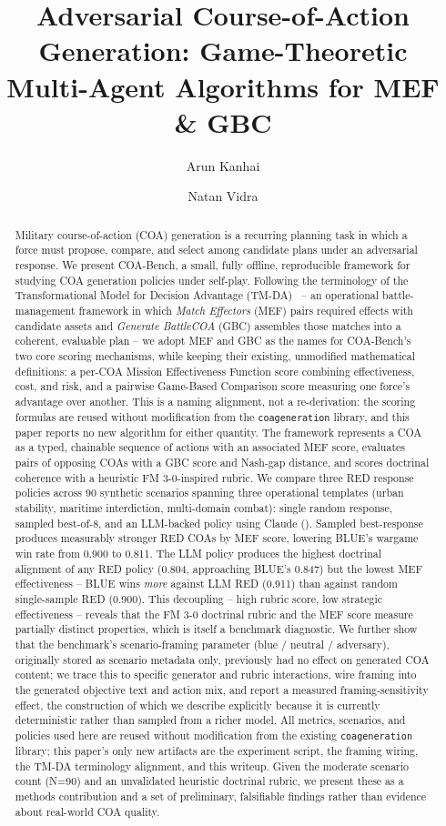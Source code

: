 \documentclass[sigconf]{acmart}
\title{Adversarial Course-of-Action Generation: Game-Theoretic Multi-Agent Algorithms for MEF \& GBC}
\author{Arun Kanhai}
\affiliation{%
  \institution{Anote AI, CUNY}
  \city{New York}
  \country{United States}}
\author{Natan Vidra}
\affiliation{%
  \institution{Anote AI}
  \city{New York}
  \country{United States}}
\begin{document}
\begin{abstract}
Military course-of-action (COA) generation is a recurring planning task in which a force must propose, compare, and select among candidate plans under an adversarial response. We present COA-Bench, a small, fully offline, reproducible framework for studying COA generation policies under self-play. Following the terminology of the Transformational Model for Decision Advantage (TM-DA)~\cite{tmda2025bootcamp} -- an operational battle-management framework in which \emph{Match Effectors} (MEF) pairs required effects with candidate assets and \emph{Generate BattleCOA} (GBC) assembles those matches into a coherent, evaluable plan -- we adopt MEF and GBC as the names for COA-Bench's two core scoring mechanisms, while keeping their existing, unmodified mathematical definitions: a per-COA Mission Effectiveness Function score combining effectiveness, cost, and risk, and a pairwise Game-Based Comparison score measuring one force's advantage over another. This is a naming alignment, not a re-derivation: the scoring formulas are reused without modification from the \texttt{coageneration} library, and this paper reports no new algorithm for either quantity. The framework represents a COA as a typed, chainable sequence of actions with an associated MEF score, evaluates pairs of opposing COAs with a GBC score and Nash-gap distance, and scores doctrinal coherence with a heuristic FM 3-0-inspired rubric. We compare three RED response policies across 90 synthetic scenarios spanning three operational templates (urban stability, maritime interdiction, multi-domain combat): single random response, sampled best-of-8, and an LLM-backed policy using Claude (). Sampled best-response produces measurably stronger RED COAs by MEF score, lowering BLUE's wargame win rate from 0.900 to 0.811. The LLM policy produces the highest doctrinal alignment of any RED policy (0.804, approaching BLUE's 0.847) but the lowest MEF effectiveness -- BLUE wins \emph{more} against LLM RED (0.911) than against random single-sample RED (0.900). This decoupling -- high rubric score, low strategic effectiveness -- reveals that the FM 3-0 doctrinal rubric and the MEF score measure partially distinct properties, which is itself a benchmark diagnostic. We further show that the benchmark's scenario-framing parameter (blue / neutral / adversary), originally stored as scenario metadata only, previously had no effect on generated COA content; we trace this to specific generator and rubric interactions, wire framing into the generated objective text and action mix, and report a measured framing-sensitivity effect, the construction of which we describe explicitly because it is currently deterministic rather than sampled from a richer model. All metrics, scenarios, and policies used here are reused without modification from the existing \texttt{coageneration} library; this paper's only new artifacts are the experiment script, the framing wiring, the TM-DA terminology alignment, and this writeup. Given the moderate scenario count (N=90) and an unvalidated heuristic doctrinal rubric, we present these as a methods contribution and a set of preliminary, falsifiable findings rather than evidence about real-world COA quality.
\end{abstract}
\end{document}
